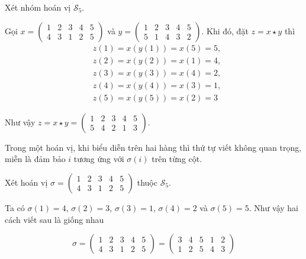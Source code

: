 \begin{example}
    Xét nhóm hoán vị $\mathcal{S}_5$. 
    
    Gọi $x = \begin{pmatrix}
        1 & 2 & 3 & 4 & 5 \\ 4 & 3 & 1 & 2 & 5
    \end{pmatrix}$ và
    $y = \begin{pmatrix}
        1 & 2 & 3 & 4 & 5 \\ 5 & 1 & 4 & 3 & 2
    \end{pmatrix}$. Khi đó, đặt $z = x \star y$ thì
    \begin{align*}
        & z(1) = x(y(1)) = x(5) = 5, \\
        & z(2) = x(y(2)) = x(1) = 4, \\
        & z(3) = x(y(3)) = x(4) = 2, \\
        & z(4) = x(y(4)) = x(3) = 1, \\ 
        & z(5) = x(y(5)) = x(2) = 3
    \end{align*}

    Như vậy $z = x \star y = \begin{pmatrix}
        1 & 2 & 3 & 4 & 5 \\ 5 & 4 & 2 & 1 & 3
    \end{pmatrix}$.
\end{example}

\begin{remark}
    Trong một hoán vị, khi biểu diễn trên hai hàng thì thứ tự viết không quan trọng,
    miễn là đảm bảo $i$ tương ứng với $\sigma(i)$ trên từng cột.
\end{remark}

\begin{example}
    Xét hoán vị $\sigma = \begin{pmatrix}
        1 & 2 & 3 & 4 & 5 \\ 4 & 3 & 1 & 2 & 5
    \end{pmatrix}$ thuộc $\mathcal{S}_5$.

    Ta có $\sigma(1) = 4$, $\sigma(2) = 3$, $\sigma(3) = 1$, $\sigma(4) = 2$
    và $\sigma(5) = 5$. Như vậy hai cách viết sau là giống nhau

    \begin{equation*}
        \sigma = 
        \begin{pmatrix}
            1 & 2 & 3 & 4 & 5 \\
            4 & 3 & 1 & 2 & 5
        \end{pmatrix} = 
        \begin{pmatrix}
            3 & 4 & 5 & 1 & 2 \\
            1 & 2 & 5 & 4 & 3
        \end{pmatrix}
    \end{equation*}
\end{example}

